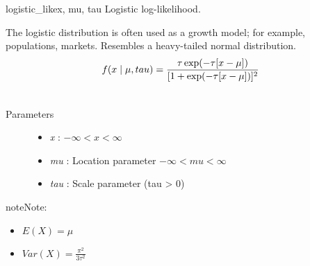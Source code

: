 \hypertarget{pymc.distributions.logistic_like}{}\begin{funcdesc}{logistic\_like}{x, mu, tau}
Logistic log-likelihood.

The logistic distribution is often used as a growth model; for example,
populations, markets. Resembles a heavy-tailed normal distribution.
\begin{gather}
\begin{split}f(x \mid \mu, tau) = \frac{\tau \exp(-\tau[x-\mu])}{[1 + \exp(-\tau[x-\mu])]^2}\end{split}\notag\\\begin{split}\end{split}\notag
\end{gather}\begin{description}
\item[Parameters] \leavevmode\begin{itemize}
\item {}
\emph{x} : $-\infty < x < \infty$

\item {}
\emph{mu} : Location parameter $-\infty < mu < \infty$

\item {}
\emph{tau} : Scale parameter (tau \textgreater{} 0)

\end{itemize}

\end{description}

\begin{notice}{note}{Note:}\begin{itemize}
\item {}
$E(X) = \mu$

\item {}
$Var(X) = \frac{\pi^2}{3\tau^2}$

\end{itemize}
\end{notice}
\end{funcdesc}


